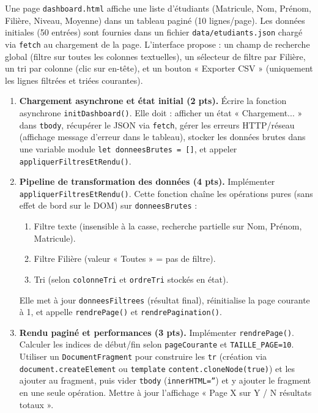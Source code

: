 \documentclass[11pt]{article}
\begin{document}
\begin{exercice}
Une page \texttt{dashboard.html} affiche une liste d'étudiants (Matricule, Nom, Prénom, Filière, Niveau, Moyenne) dans un tableau paginé (10 lignes/page). Les données initiales (50 entrées) sont fournies dans un fichier \texttt{data/etudiants.json} chargé via \texttt{fetch} au chargement de la page. L'interface propose : un champ de recherche global (filtre sur toutes les colonnes textuelles), un sélecteur de filtre par Filière, un tri par colonne (clic sur en-tête), et un bouton « Exporter CSV » (uniquement les lignes filtrées et triées courantes).

\begin{enumerate}
    \item \textbf{Chargement asynchrone et état initial (2 pts).} Écrire la fonction asynchrone \texttt{initDashboard()}. Elle doit : afficher un état « Chargement... » dans \texttt{tbody}, récupérer le JSON via \texttt{fetch}, gérer les erreurs HTTP/réseau (affichage message d'erreur dans le tableau), stocker les données brutes dans une variable module \texttt{let donneesBrutes = []}, et appeler \texttt{appliquerFiltresEtRendu()}.
    \item \textbf{Pipeline de transformation des données (4 pts).} Implémenter \texttt{appliquerFiltresEtRendu()}. Cette fonction chaîne les opérations pures (sans effet de bord sur le DOM) sur \texttt{donneesBrutes} :
    \begin{enumerate}
        \item Filtre texte (insensible à la casse, recherche partielle sur Nom, Prénom, Matricule).
        \item Filtre Filière (valeur « Toutes » = pas de filtre).
        \item Tri (selon \texttt{colonneTri} et \texttt{ordreTri} stockés en état).
    \end{enumerate}
    Elle met à jour \texttt{donneesFiltrees} (résultat final), réinitialise la page courante à 1, et appelle \texttt{rendrePage()} et \texttt{rendrePagination()}.
    \item \textbf{Rendu paginé et performances (3 pts).} Implémenter \texttt{rendrePage()}. Calculer les indices de début/fin selon \texttt{pageCourante} et \texttt{TAILLE\_PAGE=10}. Utiliser un \texttt{DocumentFragment} pour construire les \texttt{tr} (création via \texttt{document.createElement} ou \texttt{template} \texttt{content.cloneNode(true)}) et les ajouter au fragment, puis vider \texttt{tbody} (\texttt{innerHTML=''}) et y ajouter le fragment en une seule opération. Mettre à jour l'affichage « Page X sur Y / N résultats totaux ».

\end{enumerate}
\end{exercice}
\end{document}
